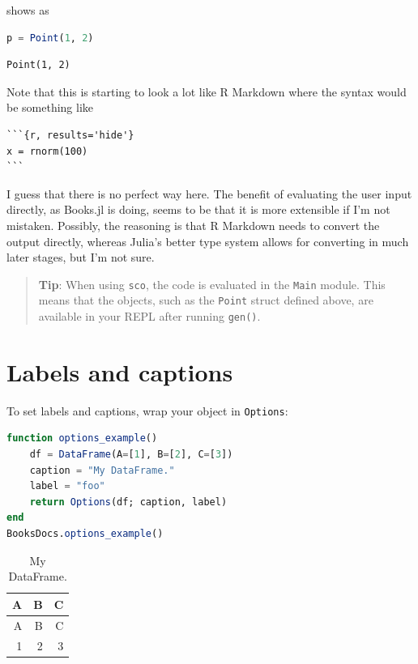 \documentclass[
  notoc %
]{tufte-book}
\newcommand{\passthrough}[1]{#1}
\begin{document}
shows as

\begin{lstlisting}[language=Julia]
p = Point(1, 2)
\end{lstlisting}

\begin{lstlisting}[language=Output]
Point(1, 2)
\end{lstlisting}

Note that this is starting to look a lot like R Markdown where the
syntax would be something like

\begin{lstlisting}
```{r, results='hide'}
x = rnorm(100)
```
\end{lstlisting}

I guess that there is no perfect way here. The benefit of evaluating the
user input directly, as Books.jl is doing, seems to be that it is more
extensible if I'm not mistaken. Possibly, the reasoning is that R
Markdown needs to convert the output directly, whereas Julia's better
type system allows for converting in much later stages, but I'm not
sure.

\begin{quote}
\textbf{Tip}: When using \passthrough{\lstinline!sco!}, the code is
evaluated in the \passthrough{\lstinline!Main!} module. This means that
the objects, such as the \passthrough{\lstinline!Point!} struct defined
above, are available in your REPL after running
\passthrough{\lstinline!gen()!}.
\end{quote}

\hypertarget{sec:labels-captions}{%
\section{Labels and captions}\label{sec:labels-captions}}

To set labels and captions, wrap your object in
\passthrough{\lstinline!Options!}:

\begin{lstlisting}[language=Julia]
function options_example()
    df = DataFrame(A=[1], B=[2], C=[3])
    caption = "My DataFrame."
    label = "foo"
    return Options(df; caption, label)
end
BooksDocs.options_example()
\end{lstlisting}

\hypertarget{tbl:foo}{}
\begin{longtable}[]{@{}rrr@{}}
\caption{\label{tbl:foo}My DataFrame.}\tabularnewline
\toprule()
A & B & C \\
\midrule()
\endfirsthead
\toprule()
A & B & C \\
\midrule()
\endhead
1 & 2 & 3 \\
\bottomrule()
\end{longtable}
\end{document}

